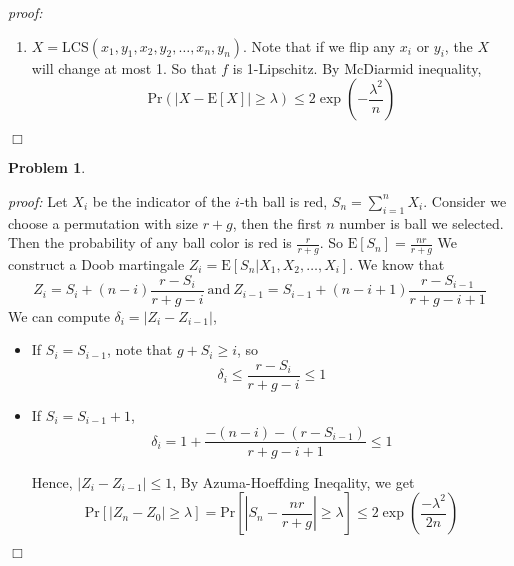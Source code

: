 \documentclass{article}
\newtheorem{problem}[theorem]{Problem}
\newenvironment{solution}{\noindent \textit{proof:}}{$\Box$}
\begin{document}
\begin{solution}
\begin{enumerate}[1.]
        \item $X = \mathrm{LCS}(x_1, y_1, x_2, y_2, \dots, x_n, y_n)$. Note that if we flip any $x_i$ or 
        $y_i$, the $X$ will change at most 1. So that $f$ is 1-Lipschitz. By McDiarmid inequality,
        $$
        \mathrm{Pr}(|X-\mathrm{E}[X]|\geq \lambda) \leq 2\exp(-\frac {\lambda^2} {n})
        $$
    \end{enumerate}
\end{solution}

\begin{problem}
\end{problem}
\begin{solution}
    Let $X_i$ be the indicator of the $i$-th ball is red, $S_n = \sum_{i=1}^n X_i$. 
    Consider we choose a permutation with size $r+g$, then the first $n$ number is ball
    we selected. Then the probability of any ball color is red is $\frac {r} {r+g}$. So
    $\mathrm{E}[S_n]=\frac{nr}{r+g}$
    We construct 
    a Doob martingale $Z_i = \mathrm{E}[S_n|X_1,X_2,\dots,X_i]$. We know that
    $$
        Z_i = S_i + (n-i)\frac {r-S_i} {r+g-i} ~\text{and}~ Z_{i-1} = S_{i-1} + (n-i+1)\frac {r-S_{i-1}} {r+g-i+1}
    $$
    We can compute $\delta_i=|Z_i-Z_{i-1}|$,
    \begin{itemize}
        \item If $S_i=S_{i-1}$, note that $g+S_i \geq i$, so
        $$
        \delta_i \leq \frac {r-S_i} {r+g-i} \leq 1
        $$
        \item If $S_i=S_{i-1}+1$, 
        $$
        \delta_i = 1 + \frac {-(n-i)-(r-S_{i-1})} {r+g-i+1} \leq 1
        $$
        
        Hence, $|Z_i-Z_{i-1}|\leq 1$, By Azuma-Hoeffding Ineqality, we get
        $$
        \mathrm{Pr}[|Z_n-Z_0| \geq \lambda] = \mathrm{Pr}[|S_n-\frac {nr} {r+g}| \geq \lambda]
        \leq 2\exp(\frac {-\lambda^2} {2n})
        $$
    \end{itemize}
    
\end{solution}
\end{document}
